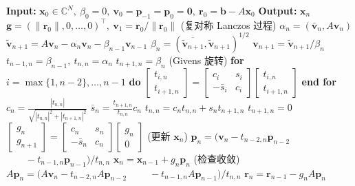 \begin{algorithm}[H]\caption{{QMR\_SYM 方法 (注意: $(\bar{\bm a},\bm b)=\bm a^{\top}\bm b$)}}\label{alg:qmr-sym}\label{srcpage:printed-100}\begin{algorithmic}[1]
\Statex\textbf{Input:} $\bm x_0\in\mathbb C^N,\ \beta_0=0,\ \bm v_0=\bm p_{-1}=\bm p_0=\bm0,\ \bm r_0=\bm b-A\bm x_0$
\Statex\textbf{Output:} $\bm x_n$
\State $\bm g=(\|\bm r_0\|,0,\ldots,0)^{\top},\ \bm v_1=\bm r_0/\|\bm r_0\|$
\State ({复对称 Lanczos 过程})
\State $\alpha_n=(\bar{\bm v}_n,A\bm v_n)$
\State $\widetilde{\bm v}_{n+1}=A\bm v_n-\alpha_n\bm v_n-\beta_{n-1}\bm v_{n-1}$
\State $\beta_n=(\overline{\widetilde{\bm v}_{n+1}},\widetilde{\bm v}_{n+1})^{1/2}$
\State $\bm v_{n+1}=\widetilde{\bm v}_{n+1}/\beta_n$
\State $t_{n-1,n}=\beta_{n-1},\ t_{n,n}=\alpha_n$
\State $t_{n+1,n}=\beta_n$
\State (Givens {旋转})
\State \textbf{for} $i=\max\{1,n-2\},\ldots,n-1$ \textbf{do}
\State $\begin{bmatrix}t_{i,n}\\t_{i+1,n}\end{bmatrix}=\begin{bmatrix}c_i&s_i\\-\bar s_i&c_i\end{bmatrix}\begin{bmatrix}t_{i,n}\\t_{i+1,n}\end{bmatrix}$
\State \textbf{end for}
\State $c_n=\frac{|t_{n,n}|}{\sqrt{|t_{n,n}|^2+|t_{n+1,n}|^2}}$
\State $\bar s_n=\frac{t_{n+1,n}}{t_{n,n}}c_n$
\State $t_{n,n}=c_nt_{n,n}+s_nt_{n+1,n}$
\State $t_{n+1,n}=0$
\State $\begin{bmatrix}g_n\\g_{n+1}\end{bmatrix}=\begin{bmatrix}c_n&s_n\\-\bar s_n&c_n\end{bmatrix}\begin{bmatrix}g_n\\0\end{bmatrix}$
\State ({更新} $\bm x_n$)
\State $\bm p_n=(\bm v_n-t_{n-2,n}\bm p_{n-2}$
\State $\qquad-t_{n-1,n}\bm p_{n-1})/t_{n,n}$
\State $\bm x_n=\bm x_{n-1}+g_n\bm p_n$
\State ({检查收敛})
\State $A\bm p_n=(A\bm v_n-t_{n-2,n}A\bm p_{n-2}$
\State $\qquad-t_{n-1,n}A\bm p_{n-1})/t_{n,n}$
\State $\bm r_n=\bm r_{n-1}-g_nA\bm p_n$
\EndFor\end{algorithmic}\end{algorithm}

